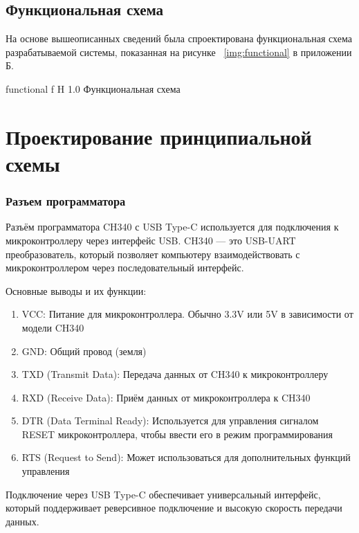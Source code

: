 \documentclass{bmstu}
\begin{document}
    \subsection{Функциональная схема}
    На основе вышеописанных сведений была спроектирована функциональная схема разрабатываемой системы,
    показанная на рисунке ~\ref{img:functional} в приложении Б.

        {functional} %
        {f} %
        {H} %
        {1.0\textwidth} %
        {Функциональная схема} %

    
    \section{Проектирование принципиальной схемы}
    
    \subsubsection{Разъем программатора}
    Разъём программатора CH340 с USB Type-C используется для подключения к микроконтроллеру через интерфейс USB.
    CH340 — это USB-UART преобразователь, который позволяет компьютеру взаимодействовать с микроконтроллером через последовательный интерфейс.

    Основные выводы и их функции:
    \begin{enumerate}
        \item VCC: Питание для микроконтроллера. Обычно 3.3V или 5V в зависимости от модели CH340
        \item GND: Общий провод (земля)
        \item TXD (Transmit Data): Передача данных от CH340 к микроконтроллеру
        \item RXD (Receive Data): Приём данных от микроконтроллера к CH340
        \item DTR (Data Terminal Ready): Используется для управления сигналом RESET микроконтроллера, чтобы ввести его в режим программирования
        \item RTS (Request to Send): Может использоваться для дополнительных функций управления
    \end{enumerate}

    Подключение через USB Type-C обеспечивает универсальный интерфейс,
    который поддерживает реверсивное подключение и высокую скорость передачи данных.
\end{document}
